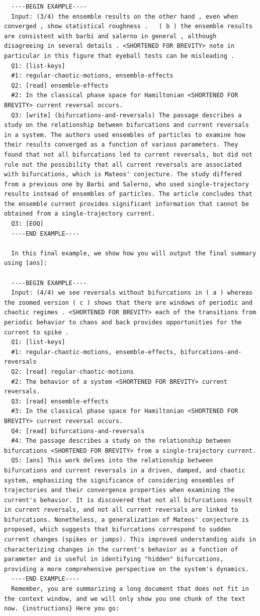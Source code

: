 \documentclass{article}
\begin{document}
\begin{lstlisting}
  ----BEGIN EXAMPLE----
  Input: (3/4) the ensemble results on the other hand , even when converged , show statistical roughness .   ( b ) the ensemble results are consistent with barbi and salerno in general , although disagreeing in several details . <SHORTENED FOR BREVITY> note in particular in this figure that eyeball tests can be misleading .
  Q1: [list-keys]
  #1: regular-chaotic-motions, ensemble-effects
  Q2: [read] ensemble-effects
  #2: In the classical phase space for Hamiltonian <SHORTENED FOR BREVITY> current reversal occurs.
  Q3: [write] (bifurcations-and-reversals) The passage describes a study on the relationship between bifurcations and current reversals in a system. The authors used ensembles of particles to examine how their results converged as a function of various parameters. They found that not all bifurcations led to current reversals, but did not rule out the possibility that all current reversals are associated with bifurcations, which is Mateos' conjecture. The study differed from a previous one by Barbi and Salerno, who used single-trajectory results instead of ensembles of particles. The article concludes that the ensemble current provides significant information that cannot be obtained from a single-trajectory current.
  Q3: [EOQ]
  ----END EXAMPLE----

  In this final example, we show how you will output the final summary using [ans]:

  ----BEGIN EXAMPLE----
  Input: (4/4) we see reversals without bifurcations in ( a ) whereas the zoomed version ( c ) shows that there are windows of periodic and chaotic regimes . <SHORTENED FOR BREVITY> each of the transitions from periodic behavior to chaos and back provides opportunities for the current to spike .
  Q1: [list-keys]
  #1: regular-chaotic-motions, ensemble-effects, bifurcations-and-reversals
  Q2: [read] regular-chaotic-motions
  #2: The behavior of a system <SHORTENED FOR BREVITY> current reversals.
  Q3: [read] ensemble-effects
  #3: In the classical phase space for Hamiltonian <SHORTENED FOR BREVITY> current reversal occurs.
  Q4: [read] bifurcations-and-reversals
  #4: The passage describes a study on the relationship between bifurcations <SHORTENED FOR BREVITY> from a single-trajectory current.
  Q5: [ans] This work delves into the relationship between bifurcations and current reversals in a driven, damped, and chaotic system, emphasizing the significance of considering ensembles of trajectories and their convergence properties when examining the current's behavior. It is discovered that not all bifurcations result in current reversals, and not all current reversals are linked to bifurcations. Nonetheless, a generalization of Mateos' conjecture is proposed, which suggests that bifurcations correspond to sudden current changes (spikes or jumps). This improved understanding aids in characterizing changes in the current's behavior as a function of parameter and is useful in identifying "hidden" bifurcations, providing a more comprehensive perspective on the system's dynamics.
  ----END EXAMPLE----
  Remember, you are summarizing a long document that does not fit in the context window, and we will only show you one chunk of the text now. {instructions} Here you go:


\end{lstlisting}
\end{document}
